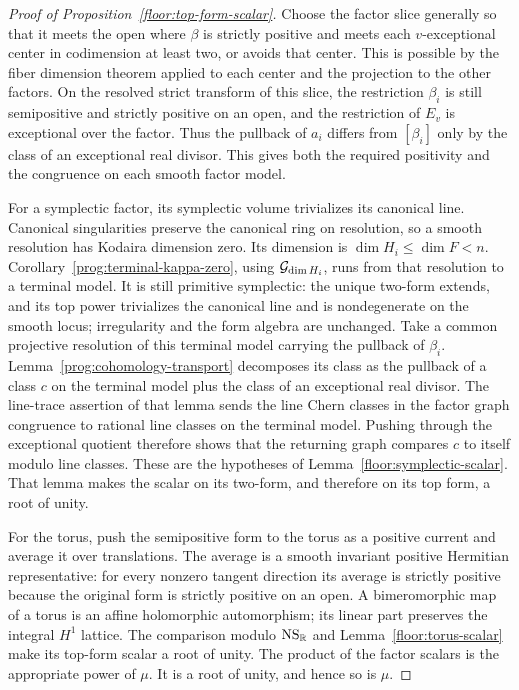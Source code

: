\begin{proof}[Proof of Proposition~\ref{floor:top-form-scalar}]
Choose the factor slice generally so that it meets the open where \(\beta\)
is strictly positive and meets each \(v\)-exceptional center in codimension at least two,
or avoids that center.  This is possible by the fiber dimension theorem
applied to each center and the projection to the other factors.  On the
resolved strict transform of this slice, the restriction \(\beta_i\)
is still semipositive and strictly positive on an open, and the restriction
of \(E_v\) is exceptional over the factor.  Thus the pullback of \(a_i\)
differs from \([\beta_i]\) only by the class of an exceptional real divisor. This
gives both the required positivity and the congruence on each smooth
factor model.

For a symplectic factor, its symplectic volume trivializes its canonical
line.  Canonical singularities preserve the canonical ring on resolution,
so a smooth resolution has Kodaira dimension zero.  Its dimension is
\(\dim H_i\leq\dim F<n\).  Corollary~\ref{prog:terminal-kappa-zero}, using
\(\mathcal G_{\dim H_i}\), runs from that resolution to a terminal model.  It is still primitive
symplectic: the unique two-form extends, and its top power trivializes the
canonical line and is nondegenerate on the smooth locus; irregularity and
the form algebra are unchanged.  Take a common projective resolution of
this terminal model carrying the pullback of \(\beta_i\).
Lemma~\ref{prog:cohomology-transport} decomposes its class as the pullback
of a class \(c\) on the terminal model plus the class of an exceptional real divisor.
The line-trace assertion of that lemma sends the line Chern classes in
the factor graph congruence to rational line classes on the terminal model.
Pushing through the exceptional quotient therefore shows that the returning
graph compares \(c\) to itself modulo line classes.  These are the
hypotheses of Lemma~\ref{floor:symplectic-scalar}.
That lemma makes the scalar on its two-form, and therefore on its top form,
a root of unity.

For the torus, push the semipositive form to the torus as a positive current
and average it over translations.  The average is a smooth invariant
positive Hermitian representative: for every nonzero tangent direction its
average is strictly positive because the original form is strictly positive
on an open.  A bimeromorphic map of a torus is an affine holomorphic
automorphism; its linear part preserves the integral \(H^1\) lattice.
The comparison modulo \(\operatorname{NS}_\mathbb R\) and Lemma~\ref{floor:torus-scalar}
make its top-form scalar a root of unity.  The product of the factor
scalars is the appropriate power of \(\mu\).  It is a root of unity,
and hence so is \(\mu\).
\end{proof}

